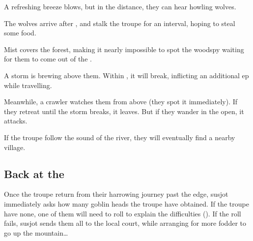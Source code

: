 \begin{multicols}{2}
\ifcase\value{temperature}
  A refreshing breeze blows, but in the distance, they can hear howling wolves.

  The wolves arrive after , and stalk the troupe for an interval, hoping to steal some food.

  \wolf
  \or
  Mist covers the forest, making it nearly impossible to spot the \gls{woodspy} waiting for them to come out of the .

  \woodspy
  \else
  A storm is brewing above them.
  Within , it will break, inflicting an additional \gls{ep} while travelling.

  Meanwhile, a \gls{crawler} watches them from above (they spot it immediately).
  If they retreat until the storm breaks, it leaves.
  But if they wander in the open, it attacks.

  \chitincrawler
\fi

If the troupe follow the sound of the river, they will eventually find a nearby \gls{village}.

\subsection{Back at the }

Once the troupe return from their harrowing journey past the \gls{edge}, \gls{susjot} immediately asks how many goblin heads the troupe have obtained.
If the troupe have none, one of them will need to roll  to explain the difficulties (\tn[8]).
If the roll fails, \gls{susjot} sends them all to the local \gls{court}, while arranging for more \gls{fodder} to go up the mountain\ldots

\end{multicols}
